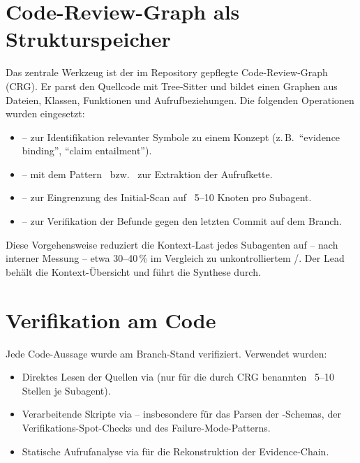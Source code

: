 \section{Code-Review-Graph als Strukturspeicher}\label{sec:crg}

Das zentrale Werkzeug ist der im Repository gepflegte Code-Review-Graph (CRG). Er parst den Quellcode mit Tree-Sitter und bildet einen Graphen aus Dateien, Klassen, Funktionen und Aufrufbeziehungen. Die folgenden Operationen wurden eingesetzt:

\begin{itemize}
  \item {} -- zur Identifikation relevanter Symbole zu einem Konzept (z.\,B.\ \enquote{evidence binding}, \enquote{claim entailment}).
  \item {} -- mit dem Pattern~ bzw.~ zur Extraktion der Aufrufkette.
  \item {} -- zur Eingrenzung des Initial-Scan auf ~5–10 Knoten pro Subagent.
  \item {} -- zur Verifikation der Befunde gegen den letzten Commit auf dem Branch.
\end{itemize}

Diese Vorgehensweise reduziert die Kontext-Last jedes Subagenten auf -- nach interner Messung -- etwa 30–40\,\% im Vergleich zu unkontrolliertem /. Der Lead behält die Kontext-Übersicht und führt die Synthese durch.

\section{Verifikation am Code}\label{sec:verifikation}

Jede Code-Aussage wurde am Branch-Stand  verifiziert. Verwendet wurden:

\begin{itemize}
  \item Direktes Lesen der Quellen via  (nur für die durch CRG benannten ~5–10 Stellen je Subagent).
  \item Verarbeitende Skripte via  -- insbesondere für das Parsen der -Schemas, der Verifikations-Spot-Checks und des Failure-Mode-Patterns.
  \item Statische Aufrufanalyse via  für die Rekonstruktion der Evidence-Chain.
\end{itemize}

